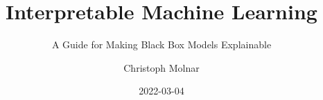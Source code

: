 \documentclass[
  10pt,
]{scrbook}
\title{Interpretable Machine Learning}
\subtitle{A Guide for Making Black Box Models Explainable}
\author{Christoph Molnar}
\date{2022-03-04}
\begin{document}
\maketitle

\thispagestyle{empty}

\end{document}
